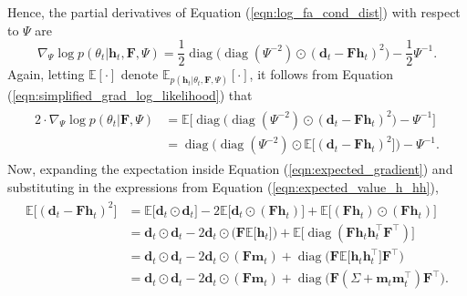 \documentclass[msc,deptreport.inf]{infthesis} %
\newcommand{\matr}[1]{\mathbf{#1}}
\newcommand{\E}{\mathbb E}
\newcommand{\diag}{\mathop{\mathrm{diag}}}
\begin{document}
Hence, the partial derivatives of Equation (\ref{eqn:log_fa_cond_dist}) with respect to $\Psi$ are
\begin{equation}
	\nabla_{\Psi} \log p(\theta_t | \matr{h}_t, \matr{F}, \Psi)
	= \frac{1}{2} \diag\big(\diag(\Psi^{-2}) \odot (\matr{d}_t - \matr{Fh}_t)^2\big) - \frac{1}{2}\Psi^{-1}.
\end{equation}
Again, letting $\E[\cdot]$ denote $\E_{p(\matr{h}_t | \theta_t, \matr{F}, \Psi)}[\cdot]$, it follows from Equation (\ref{eqn:simplified_grad_log_likelihood}) that
\begin{align}\label{eqn:expected_gradient}
\begin{split}
	2 \cdot \nabla_{\Psi} \log p(\theta_t | \matr{F}, \Psi) 
	& = \E \big[ \diag\big(\diag(\Psi^{-2}) \odot (\matr{d}_t - \matr{Fh}_t)^2\big) - \Psi^{-1} \big] \\
	& = \diag\Big(\diag(\Psi^{-2}) \odot \E \big[(\matr{d}_t - \matr{Fh}_t)^2\big]\Big) - \Psi^{-1}.
\end{split}
\end{align} 
Now, expanding the expectation inside Equation (\ref{eqn:expected_gradient}) and substituting in the expressions from Equation (\ref{eqn:expected_value_h_hh}),
\begin{align}\label{eqn:expected_gradient_d_Fh}
\begin{split}
	\E \big[(\matr{d}_t - \matr{Fh}_t)^2\big] 
	& = \E \big[\matr{d}_t \odot \matr{d}_t \big] - 2\E \big[ \matr{d}_t \odot (\matr{Fh}_t) \big] + \E \big[ (\matr{Fh}_t) \odot (\matr{Fh}_t) \big] \\
	& = \matr{d}_t \odot \matr{d}_t - 2\matr{d}_t \odot \big(\matr{F} \E \big[ \matr{h}_t \big]\big) + \E \big[ \diag(\matr{F}\matr{h}_t \matr{h}_t^\intercal  \matr{F}^\intercal) \big] \\
	& = \matr{d}_t \odot \matr{d}_t - 2\matr{d}_t \odot (\matr{F} \matr{m}_t) + \diag\big( \matr{F} \E \big[ \matr{h}_t \matr{h}_t^\intercal \big] \matr{F}^\intercal \big) \\
	& = \matr{d}_t \odot \matr{d}_t - 2\matr{d}_t \odot (\matr{F} \matr{m}_t) + \diag\big( \matr{F} (\Sigma + \matr{m}_t \matr{m}_t^\intercal) \matr{F}^\intercal \big).
\end{split}
\end{align} 
\end{document}
